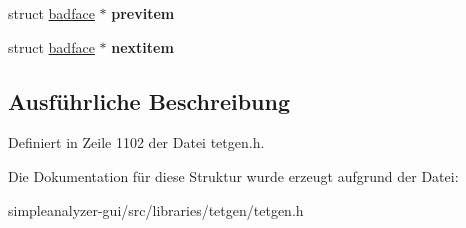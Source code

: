 \begin{DoxyCompactItemize}
\item 
\hypertarget{structtetgenmesh_1_1badface_a959dcf8e2358a4288d6ff5daa62ac733}{struct \hyperlink{structtetgenmesh_1_1badface}{badface} $\ast$ {\bfseries previtem}}\label{structtetgenmesh_1_1badface_a959dcf8e2358a4288d6ff5daa62ac733}

\item 
\hypertarget{structtetgenmesh_1_1badface_ae6571a458c9d7f96bcda1347d640b948}{struct \hyperlink{structtetgenmesh_1_1badface}{badface} $\ast$ {\bfseries nextitem}}\label{structtetgenmesh_1_1badface_ae6571a458c9d7f96bcda1347d640b948}

\end{DoxyCompactItemize}


\subsection{Ausführliche Beschreibung}


Definiert in Zeile 1102 der Datei tetgen.\-h.



Die Dokumentation für diese Struktur wurde erzeugt aufgrund der Datei\-:\begin{DoxyCompactItemize}
\item 
simpleanalyzer-\/gui/src/libraries/tetgen/tetgen.\-h\end{DoxyCompactItemize}
